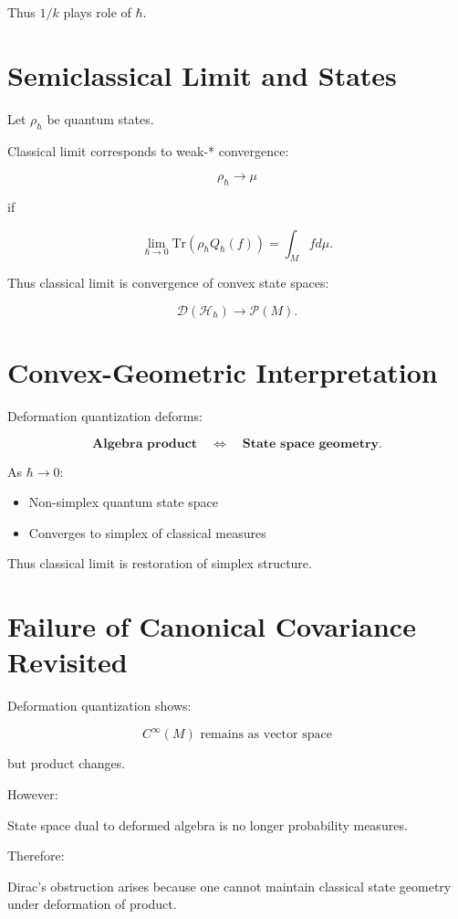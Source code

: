 \documentclass[11pt]{book}
\begin{document}
Thus $1/k$ plays role of $\hbar$.

\section{Semiclassical Limit and States}

Let $\rho_\hbar$ be quantum states.

Classical limit corresponds to weak-* convergence:

\[
\rho_\hbar \to \mu
\]

if

\[
\lim_{\hbar\to0} \mathrm{Tr}(\rho_\hbar Q_\hbar(f))
=
\int_M f d\mu.
\]

Thus classical limit is convergence of convex state spaces:

\[
\mathcal{D}(\mathcal{H}_\hbar)
\to
\mathcal{P}(M).
\]

\section{Convex-Geometric Interpretation}

Deformation quantization deforms:

\[
\textbf{Algebra product}
\quad \Longleftrightarrow \quad
\textbf{State space geometry}.
\]

As $\hbar\to0$:

\begin{itemize}
\item Non-simplex quantum state space
\item Converges to simplex of classical measures
\end{itemize}

Thus classical limit is restoration of simplex structure.

\section{Failure of Canonical Covariance Revisited}

Deformation quantization shows:

\[
C^\infty(M) \text{ remains as vector space}
\]

but product changes.

However:

State space dual to deformed algebra is no longer probability measures.

Therefore:

Dirac’s obstruction arises because
one cannot maintain classical state geometry
under deformation of product.
\end{document}
